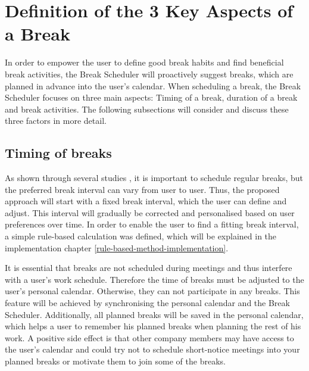 \documentclass{hasel_thesis}
\begin{document}
\section{Definition of the 3 Key Aspects of a Break }
 In order to empower the user to define good break habits and find beneficial break activities, the Break Scheduler will proactively suggest breaks, which are planned in advance into the user's calendar. When scheduling a break, the Break Scheduler focuses on three main aspects: Timing of a break, duration of a break and break activities. The following subsections will consider and discuss these three factors in more detail.

\subsection{Timing of breaks}
As shown through several studies \cite{Largo-Wight.2017} \cite{KimS.ParkY.&Niu.2017}, it is important to schedule regular breaks, but the preferred break interval can vary from user to user. Thus, the proposed approach will start with a fixed break interval, which the user can define and adjust. This interval will gradually be corrected and personalised based on user preferences over time. In order to enable the user to find a fitting break interval, a simple rule-based calculation was defined, which will be explained in the implementation chapter \ref{rule-based-method-implementation}.

It is essential that breaks are not scheduled during meetings and thus interfere with a user's work schedule. Therefore the time of breaks must be adjusted to the user's personal calendar. Otherwise, they can not participate in any breaks. This feature will be achieved by synchronising the personal calendar and the Break Scheduler. Additionally, all planned breaks will be saved in the personal calendar, which helps a user to remember his planned breaks when planning the rest of his work. A positive side effect is that other company members may have access to the user's calendar and could try not to schedule short-notice meetings into your planned breaks or motivate them to join some of the breaks.
\end{document}
